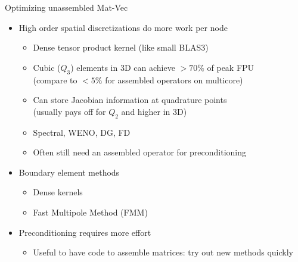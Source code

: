 \begin{frame}{Optimizing unassembled Mat-Vec}
  \begin{itemize}
  \item High order spatial discretizations do more work per node
    \begin{itemize}
    \item Dense tensor product kernel (like small BLAS3)
    \item Cubic ($Q_3$) elements in 3D can achieve $>70\%$ of peak FPU \\
      (compare to $< 5\%$ for assembled operators on multicore)
    \item Can store Jacobian information at quadrature points \\
      (usually pays off for $Q_2$ and higher in 3D)
    \item Spectral, WENO, DG, FD
    \item Often still need an assembled operator for preconditioning
    \end{itemize}
  \item Boundary element methods
    \begin{itemize}
    \item Dense kernels
    \item Fast Multipole Method (FMM)
    \end{itemize}
  \item<2> \alert{Preconditioning requires more effort}
    \begin{itemize}
    \item Useful to have code to assemble matrices: try out new methods quickly
    \end{itemize}
  \end{itemize}
\end{frame}
